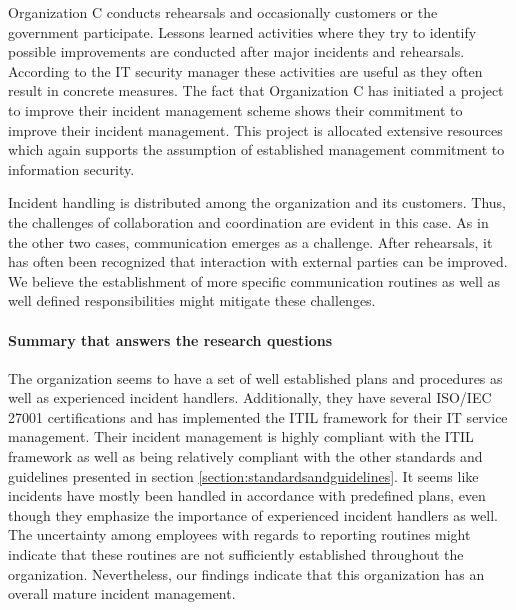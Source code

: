 Organization C conducts rehearsals and occasionally customers or the government participate. Lessons learned activities where they try to identify possible improvements are conducted after major incidents and rehearsals. According to the IT security manager these activities are useful as they often result in concrete measures. The fact that Organization C has initiated a project to improve their incident management scheme shows their commitment to improve their incident management. This project is allocated extensive resources which again supports the assumption of established management commitment to information security.

Incident handling is distributed among the organization and its customers. Thus, the challenges of collaboration and coordination are evident in this case. As in the other two cases, communication emerges as a challenge. After rehearsals, it has often been recognized that interaction with external parties can be improved. We believe the establishment of more specific communication routines as well as well defined responsibilities might mitigate these challenges.

\paragraph{Summary that answers the research questions}
The organization seems to have a set of well established plans and procedures as well as experienced incident handlers. Additionally, they have several ISO/IEC 27001 certifications and has implemented the ITIL framework for their IT service management. Their incident management is highly compliant with the ITIL framework as well as being relatively compliant with the other standards and guidelines presented in section \ref{section:standardsandguidelines}. It seems like incidents have mostly been handled in accordance with predefined plans, even though they emphasize the importance of experienced incident handlers as well. The uncertainty among employees with regards to reporting routines might indicate that these routines are not sufficiently established throughout the organization. Nevertheless, our findings indicate that this organization has an overall mature incident management. 

